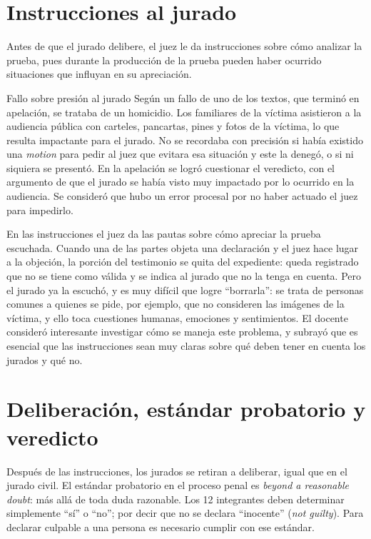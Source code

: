 \documentclass[12pt,oneside]{book}
\begin{document}
\section{Instrucciones al jurado}

Antes de que el jurado delibere, el juez le da instrucciones sobre cómo analizar la prueba, pues durante la producción de la prueba pueden haber ocurrido situaciones que influyan en su apreciación.

\begin{example}{Fallo sobre presión al jurado}
Según un fallo de uno de los textos, que terminó en apelación, se trataba de un homicidio. Los familiares de la víctima asistieron a la audiencia pública con carteles, pancartas, pines y fotos de la víctima, lo que resulta impactante para el jurado. No se recordaba con precisión si había existido una \textit{motion} para pedir al juez que evitara esa situación y este la denegó, o si ni siquiera se presentó. %
En la apelación se logró cuestionar el veredicto, con el argumento de que el jurado se había visto muy impactado por lo ocurrido en la audiencia. Se consideró que hubo un error procesal por no haber actuado el juez para impedirlo.
\end{example}

En las instrucciones el juez da las pautas sobre cómo apreciar la prueba escuchada. Cuando una de las partes objeta una declaración y el juez hace lugar a la objeción, la porción del testimonio se quita del expediente: queda registrado que no se tiene como válida y se indica al jurado que no la tenga en cuenta. Pero el jurado ya la escuchó, y es muy difícil que logre ``borrarla'': se trata de personas comunes a quienes se pide, por ejemplo, que no consideren las imágenes de la víctima, y ello toca cuestiones humanas, emociones y sentimientos. El docente consideró interesante investigar cómo se maneja este problema, y subrayó que es esencial que las instrucciones sean muy claras sobre qué deben tener en cuenta los jurados y qué no.

\section{Deliberación, estándar probatorio y veredicto}

Después de las instrucciones, los jurados se retiran a deliberar, igual que en el jurado civil. El estándar probatorio en el proceso penal es \textit{beyond a reasonable doubt}: más allá de toda duda razonable. Los 12 integrantes deben determinar simplemente ``sí'' o ``no''; por decir que no se declara ``inocente'' (\textit{not guilty}). Para declarar culpable a una persona es necesario cumplir con ese estándar.
\end{document}
